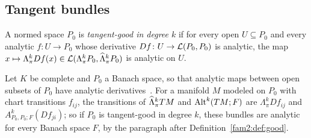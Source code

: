 \subsection{Tangent bundles}\label{fam2:ssec:tangent}

\begin{definition}\label{fam2:def:tangent}
A normed space $P_0$ is \emph{tangent-good in degree $k$} if for every open $U\subseteq P_0$ and every analytic
$f\colon U\to P_0$ whose derivative $Df\colon U\to\mathcal L(P_0,P_0)$ is analytic, the map
$x\mapsto\Lambda^k_\pi Df(x)\in\mathcal L(\Lambda^k_\pi P_0,\widehat\Lambda^k_\pi P_0)$ is analytic on $U$.
\end{definition}

Let $K$ be complete and $P_0$ a Banach space, so that analytic maps between open subsets of $P_0$ have analytic
derivatives~\cite{Bou}. For a manifold $M$ modeled on $P_0$ with chart transitions $f_{ij}$, the transitions of
$\widehat\Lambda^k_\pi TM$ and $\operatorname{Alt}^k(TM;F)$ are $\Lambda^k_\pi Df_{ij}$ and $A^k_{P_0,P_0;F}(Df_{ji})$; so if $P_0$ is
tangent-good in degree $k$, these bundles are analytic for every Banach space $F$, by the paragraph after
Definition~\ref{fam2:def:good}.

